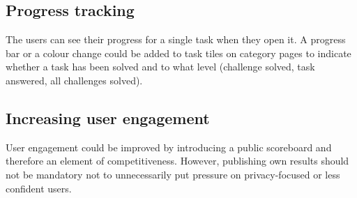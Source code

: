 \subsection{Progress tracking}

The users can see their progress for a single task when they open it. A progress bar or a colour change could be added to task tiles on category pages to indicate whether a task has been solved and to what level (challenge solved, task answered, all challenges solved).

\subsection{Increasing user engagement}

User engagement could be improved by introducing a public scoreboard and therefore an element of competitiveness. However, publishing own results should not be mandatory not to unnecessarily put pressure on privacy-focused or less confident users.
